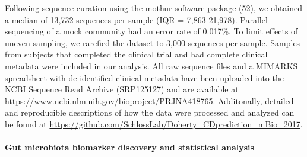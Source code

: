 \documentclass[12pt,]{article}
\let\oldparagraph\paragraph
\renewcommand{\paragraph}[1]{\oldparagraph{#1}\mbox{}}
\begin{document}
Following sequence curation using the mothur software package (52), we
obtained a median of 13,732 sequences per sample (IQR = 7,863-21,978).
Parallel sequencing of a mock community had an error rate of 0.017\%. To
limit effects of uneven sampling, we rarefied the dataset to 3,000
sequences per sample. Samples from subjects that completed the clinical
trial and had complete clinical metadata were included in our analysis.
All raw sequence files and a MIMARKS spreadsheet with de-identified
clinical metadata have been uploaded into the NCBI Sequence Read Archive
(SRP125127) and are available at
\url{https://www.ncbi.nlm.nih.gov/bioproject/PRJNA418765}. Additonally,
detailed and reproducible descriptions of how the data were processed
and analyzed can be found at
\url{https://github.com/SchlossLab/Doherty_CDprediction_mBio_2017}.

\paragraph{Gut microbiota biomarker discovery and statistical
analysis}\label{gut-microbiota-biomarker-discovery-and-statistical-analysis}
\end{document}
